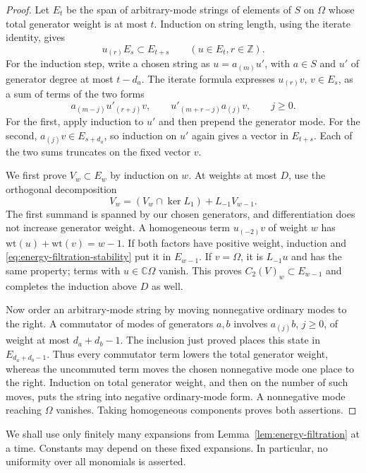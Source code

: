 \begin{proof}
Let $E_t$ be the span of arbitrary-mode strings of elements of $S$ on
$\Omega$ whose total generator weight is at most $t$.  Induction on
string length, using the iterate identity, gives
\begin{equation}\label{eq:energy-filtration-stability}
 u_{(r)}E_s\subset E_{t+s}\qquad(u\in E_t, r\in\mathbb Z).
\end{equation}
For the induction step, write a chosen string as $u=a_{(m)}u'$, with
$a\in S$ and $u'$ of generator degree at most $t-d_a$.
The iterate formula expresses $u_{(r)}v$, $v\in E_s$, as a sum of terms
of the two forms
\[
 a_{(m-j)}u'_{(r+j)}v,
 \qquad u'_{(m+r-j)}a_{(j)}v,
 \qquad j\geq0.
\]
For the first, apply induction to $u'$ and then prepend the generator
mode. For the second, $a_{(j)}v\in E_{s+d_a}$, so induction on $u'$
again gives a vector in $E_{t+s}$. Each of the two sums truncates on
the fixed vector $v$.

We first prove $V_w\subset E_w$ by induction on $w$.  At weights at
most $D$, use the orthogonal decomposition
\[
 V_w=(V_w\cap\ker L_1)+L_{-1}V_{w-1}.
\]
The first summand is spanned by our chosen generators, and differentiation
does not increase generator weight.  A homogeneous term $u_{(-2)}v$ of
weight $w$ has $\mathrm{wt}(u)+\mathrm{wt}(v)=w-1$.  If both factors
have positive weight, induction and
\eqref{eq:energy-filtration-stability} put it in $E_{w-1}$.  If
$v=\Omega$, it is $L_{-1}u$ and has the same property; terms with
$u\in\mathbb C\Omega$ vanish.  This proves
$C_2(V)_w\subset E_{w-1}$ and completes the induction above $D$ as well.

Now order an arbitrary-mode string by moving nonnegative ordinary modes
to the right.  A commutator of modes of generators $a,b$ involves
$a_{(j)}b$, $j\geq0$, of weight at most $d_a+d_b-1$.  The inclusion
just proved places this state in $E_{d_a+d_b-1}$.  Thus every
commutator term lowers the total generator weight, whereas the
uncommuted term moves the chosen nonnegative mode one place to the
right.  Induction on total generator weight, and then on the number of
such moves, puts the string into negative ordinary-mode form.  A
nonnegative mode reaching $\Omega$ vanishes.  Taking homogeneous
components proves both assertions.
\end{proof}

We shall use only finitely many expansions from
Lemma~\ref{lem:energy-filtration} at a time.  Constants may depend on
these fixed expansions.  In particular, no uniformity over all
monomials is asserted.


